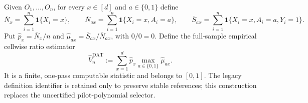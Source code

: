 Given \(O_1,\ldots,O_n\), for every \(x\in[d]\) and \(a\in\{0,1\}\) define
\[
 \overline N_x=\sum_{i=1}^n\mathbf 1\{X_i=x\},\qquad
 \overline N_{ax}=\sum_{i=1}^n\mathbf 1\{X_i=x,A_i=a\},\qquad
 \overline S_{ax}=\sum_{i=1}^n\mathbf 1\{X_i=x,A_i=a,Y_i=1\}.
\]
Put \(\widehat p_x=\overline N_x/n\) and \(\widehat\mu_{ax}=\overline S_{ax}/\overline N_{ax}\), with \(0/0=0\).  Define the full-sample empirical cellwise ratio estimator
\[
 \widehat V_n^{\mathrm{DAT}}
 :=\sum_{x=1}^d\widehat p_x
       \max_{a\in\{0,1\}}\widehat\mu_{ax}.
\]
It is a finite, one-pass computable statistic and belongs to \([0,1]\).  The legacy definition identifier is retained only to preserve stable references; this construction replaces the uncertified pilot-polynomial selector.